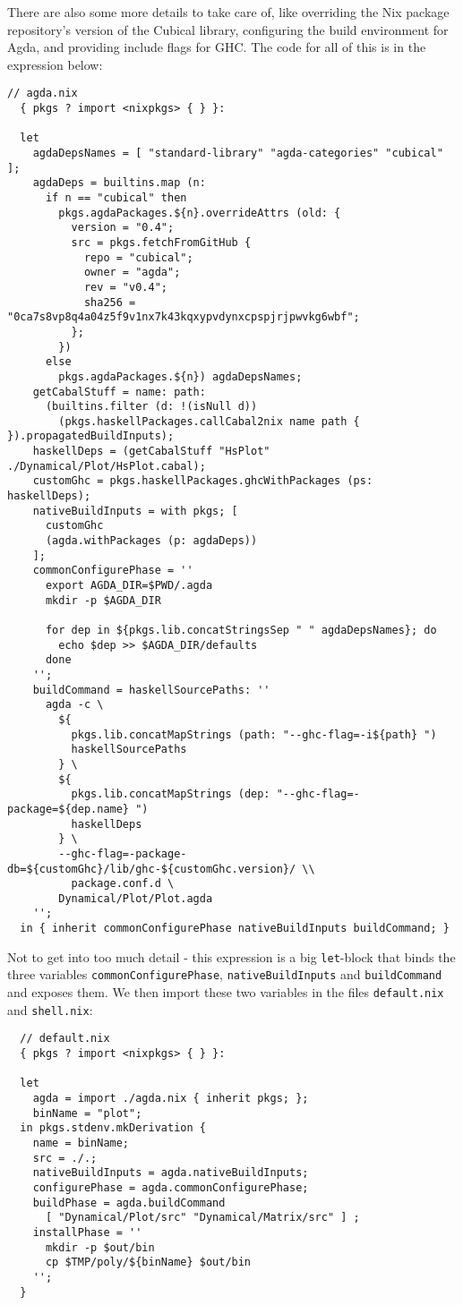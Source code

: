 There are also some more details to take care of, like overriding the Nix package repository's version of the Cubical library, configuring the build environment for Agda, and providing include flags for GHC. The code for all of this is in the expression below:
\begin{verbatim}
// agda.nix
  { pkgs ? import <nixpkgs> { } }:

  let
    agdaDepsNames = [ "standard-library" "agda-categories" "cubical" ];
    agdaDeps = builtins.map (n:
      if n == "cubical" then
        pkgs.agdaPackages.${n}.overrideAttrs (old: {
          version = "0.4";
          src = pkgs.fetchFromGitHub {
            repo = "cubical";
            owner = "agda";
            rev = "v0.4";
            sha256 = "0ca7s8vp8q4a04z5f9v1nx7k43kqxypvdynxcpspjrjpwvkg6wbf";
          };
        })
      else
        pkgs.agdaPackages.${n}) agdaDepsNames;
    getCabalStuff = name: path:
      (builtins.filter (d: !(isNull d))
        (pkgs.haskellPackages.callCabal2nix name path { }).propagatedBuildInputs);
    haskellDeps = (getCabalStuff "HsPlot" ./Dynamical/Plot/HsPlot.cabal);
    customGhc = pkgs.haskellPackages.ghcWithPackages (ps: haskellDeps);
    nativeBuildInputs = with pkgs; [
      customGhc
      (agda.withPackages (p: agdaDeps))
    ];
    commonConfigurePhase = ''
      export AGDA_DIR=$PWD/.agda
      mkdir -p $AGDA_DIR
  
      for dep in ${pkgs.lib.concatStringsSep " " agdaDepsNames}; do
        echo $dep >> $AGDA_DIR/defaults
      done
    '';
    buildCommand = haskellSourcePaths: ''
      agda -c \
        ${
          pkgs.lib.concatMapStrings (path: "--ghc-flag=-i${path} ")
          haskellSourcePaths
        } \
        ${
          pkgs.lib.concatMapStrings (dep: "--ghc-flag=-package=${dep.name} ")
          haskellDeps
        } \
        --ghc-flag=-package-db=${customGhc}/lib/ghc-${customGhc.version}/ \\
          package.conf.d \
        Dynamical/Plot/Plot.agda
    '';
  in { inherit commonConfigurePhase nativeBuildInputs buildCommand; }  
\end{verbatim}

Not to get into too much detail - this expression is a big \texttt{let}-block that binds the three variables \texttt{commonConfigurePhase}, \texttt{nativeBuildInputs} and \texttt{buildCommand} and exposes them. We then import these two variables in the files \texttt{default.nix} and \texttt{shell.nix}:

\begin{verbatim}
  // default.nix
  { pkgs ? import <nixpkgs> { } }:

  let
    agda = import ./agda.nix { inherit pkgs; };
    binName = "plot";
  in pkgs.stdenv.mkDerivation {
    name = binName;
    src = ./.;
    nativeBuildInputs = agda.nativeBuildInputs;
    configurePhase = agda.commonConfigurePhase;
    buildPhase = agda.buildCommand 
      [ "Dynamical/Plot/src" "Dynamical/Matrix/src" ] ;
    installPhase = ''
      mkdir -p $out/bin
      cp $TMP/poly/${binName} $out/bin
    '';
  }  
\end{verbatim}

